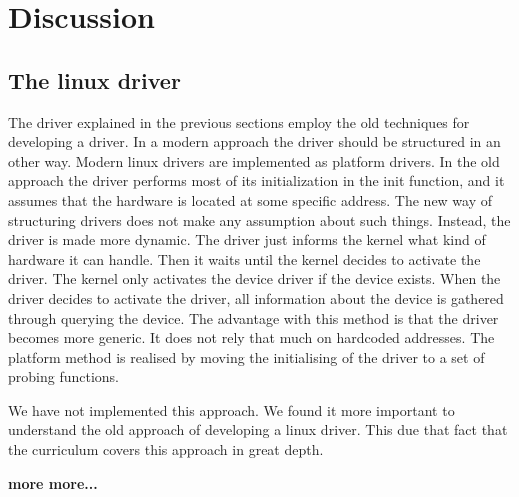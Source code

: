 \section{Discussion}


\subsection{The linux driver}
The driver explained in the previous sections employ the old techniques for developing a driver. In a modern approach the driver should be structured in an other way. Modern linux drivers are implemented as platform drivers. In the old approach the driver performs most of its initialization in the init function, and it assumes that the hardware is located at some specific address. The new way of structuring drivers does not make any assumption about such things. Instead, the driver is made more dynamic. The driver just informs the kernel what kind of hardware it can handle. Then it waits until the kernel decides to activate the driver. The kernel only activates the device driver if the device exists. When the driver decides to activate the driver, all information about the device is gathered through querying the device. The advantage with this method is that the driver becomes more generic. It does not rely that much on hardcoded addresses. The platform method is realised by moving the initialising  of the driver to a set of probing functions. 

We have not implemented this approach. We found it more important to understand the old approach of developing a linux driver. This due that fact that the curriculum covers this approach in great depth. 

{\bf more more...}





